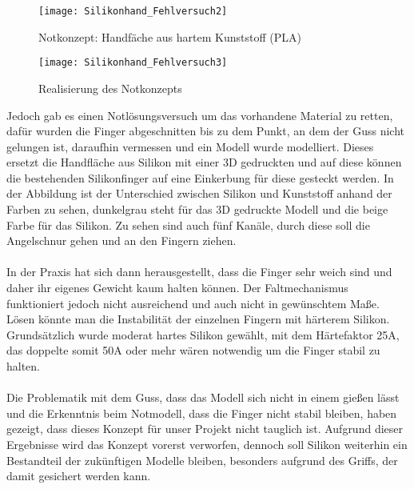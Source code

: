 \documentclass[titlepage,12pt,twoside]{article}
\begin{document}
\begin{figure}[H]
	\begin{center}
		\scalebox{0.7}
		{\texttt{[image: Silikonhand\_Fehlversuch2]}}
		\caption{Notkonzept: Handfäche aus hartem Kunststoff (PLA)}
		\label{fig:Silikonhand_Fehlversuch2}			
	\end{center}
\end{figure}
\begin{figure}[H]
	\begin{center}
		\scalebox{0.7}
		{\texttt{[image: Silikonhand\_Fehlversuch3]}}
		\caption{Realisierung des Notkonzepts}
		\label{fig:Silikonhand_Fehlversuch3}			
	\end{center}
\end{figure}
\hfill \break
\hfill \break
Jedoch gab es einen Notlösungsversuch um das vorhandene Material zu retten, dafür wurden die Finger abgeschnitten bis zu dem Punkt, an dem der Guss nicht gelungen ist, daraufhin vermessen und ein Modell wurde modelliert. Dieses ersetzt die Handfläche 
aus Silikon mit einer 3D gedruckten und auf diese können die bestehenden Silikonfinger auf eine Einkerbung für diese gesteckt werden. In der Abbildung ist der Unterschied zwischen Silikon und Kunststoff anhand der Farben zu sehen, dunkelgrau steht 
für das 3D gedruckte Modell und die beige Farbe für das Silikon. Zu sehen sind auch fünf Kanäle, durch diese soll die Angelschnur gehen und an den Fingern ziehen. \\
\\
In der Praxis hat sich dann herausgestellt, dass die Finger sehr weich sind und daher ihr eigenes Gewicht kaum halten können. Der Faltmechanismus funktioniert jedoch nicht ausreichend und auch nicht in gewünschtem Maße. Lösen könnte man die 
Instabilität der einzelnen Fingern mit härterem Silikon. Grundsätzlich wurde moderat hartes Silikon gewählt, mit dem Härtefaktor 25A, das doppelte somit 50A oder mehr wären notwendig um die Finger stabil zu halten. \\
\\
Die Problematik mit dem Guss, dass das Modell sich nicht in einem gießen lässt und die Erkenntnis beim Notmodell, dass die Finger nicht stabil bleiben, haben gezeigt, dass dieses Konzept für unser Projekt nicht tauglich ist. Aufgrund dieser 
Ergebnisse wird das Konzept vorerst verworfen, dennoch soll Silikon weiterhin ein Bestandteil der zukünftigen Modelle bleiben, besonders aufgrund des Griffs, der damit gesichert werden kann. \\
\\
\newpage
\end{document}
